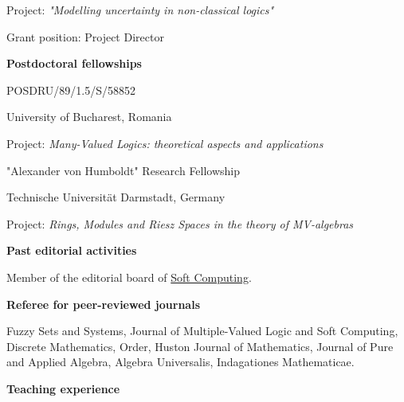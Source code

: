 \documentclass[11pt]{article}
\begin{document}
Project:  {\em "Modelling uncertainty in non-classical logics"} 

Grant position:  Project Director



\vspace{.2cm}
\noindent
\textbf{Postdoctoral fellowships}



 POSDRU/89/1.5/S/58852

University of Bucharest, Romania

Project: {\em Many-Valued Logics: theoretical aspects and applications}

 "Alexander von Humboldt" Research Fellowship

Technische Universit\"{a}t Darmstadt, Germany

Project: {\em Rings, Modules and Riesz Spaces in the theory of MV-algebras}



\vspace{.2cm}
\noindent
\textbf{Past editorial activities}

\noindent  [- February, 2023] Member of the editorial board of
\href{http://www.springer.com/engineering/computational+intelligence+and+complexity/journal/500}{Soft
Computing}.



\noindent
\textbf{Referee for peer-reviewed journals}

\noindent
Fuzzy Sets and Systems, Journal of Multiple-Valued Logic and Soft Computing, Discrete Mathematics, Order, Huston Journal of Mathematics, Journal of Pure and Applied Algebra, Algebra Universalis, Indagationes Mathematicae.

%


\vspace{.2cm}
\noindent
\textbf{Teaching experience}
\end{document}
